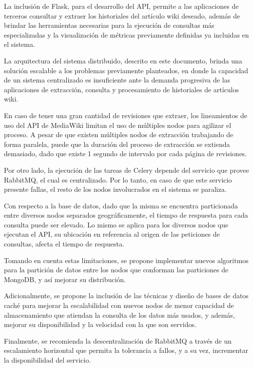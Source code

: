 La inclusión de Flask, para el desarrollo del API, permite a las aplicaciones de terceros consultar y extraer
los historiales del artículo wiki deseado, además de brindar las herramientas necesarias para la ejecución
de consultas más especializadas y la visualización de métricas previamente definidas ya incluidas en el sistema.

La arquitectura del sistema distribuido, descrito en este documento, brinda
una solución escalable a los problemas previamente planteados, en donde la capacidad
de un sistema centralizado es insuficiente ante la demanda progresiva de las aplicaciones de
extracción, consulta y procesamiento de historiales de artículos wiki.

En caso de tener una gran cantidad de revisiones que extraer, los lineamientos de uso del API de MediaWiki limitan el uso de múltiples nodos para agilizar el proceso.
A pesar de que existen múltiples nodos de extracción trabajando de forma paralela, puede que la duración del proceso de extracción se extienda demasiado, dado que existe 1 segundo de intervalo por cada página de revisiones.

Por otro lado, la ejecución de las tareas de Celery depende del servicio que provee RabbitMQ, el cual es centralizado.
Por lo tanto, en caso de que este servicio presente fallas, el resto de los nodos involucrados en el sistema se paraliza.

Con respecto a la base de datos, dado que la misma se encuentra particionada entre diversos nodos separados geográficamente, el tiempo de respuesta para cada consulta puede ser elevado.
Lo mismo se aplica para los diversos nodos que ejecutan el API, su ubicación en referencia al origen de las peticiones de consultas, afecta el tiempo de respuesta.

Tomando en cuenta estas limitaciones, se propone implementar nuevos algoritmos para la partición de datos entre los nodos que conforman las particiones de MongoDB, y así mejorar su distribución.

Adicionalmente, se propone la inclusión de las técnicas y diseño de bases de datos caché para mejorar la escalabilidad con nuevos nodos de menor capacidad de almacenamiento que atiendan la consulta de los datos más usados, y además, mejorar su disponibilidad y la velocidad con la que son servidos.

Finalmente, se recomienda la descentralización de RabbitMQ a través de un escalamiento horizontal que permita la tolerancia a fallos, y a su vez, incrementar la disponibilidad del servicio.
